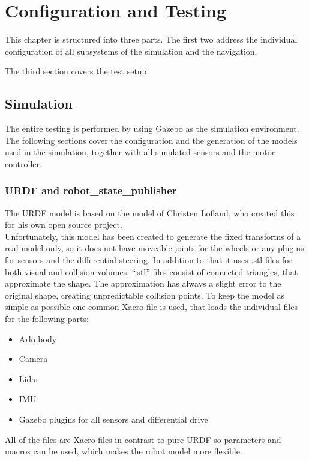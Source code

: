 \chapter{Configuration and Testing}
\label{configurationandtesting}

This chapter is structured into three parts. The first two address the individual configuration of all subsystems of the simulation and the navigation.

The third section covers the test setup.

\section{Simulation}
The entire testing is performed by using Gazebo as the simulation environment. The following sections cover the configuration and the generation of the models used in the simulation, together with all simulated sensors and the motor controller.

\subsection{URDF and robot\_state\_publisher}

The URDF model is based on the model of Christen Lofland, who created this for his own open source project\cite{chrisl8}.\\

Unfortunately, this model has been created to generate the fixed transforms of a real model only, so it does not have moveable joints for the wheels or any plugins for sensors and the differential steering. In addition to that it uses .stl files for both visual and collision volumes. ``.stl'' files consist of connected triangles, that approximate the shape. The approximation has always a slight error to the original shape, creating unpredictable collision points.
To keep the model as simple as possible one common Xacro file is used, that loads the individual files for the following parts:
\begin{itemize}
	\item Arlo body
	\item Camera
	\item Lidar
	\item IMU
	\item Gazebo plugins for all sensors and differential drive
\end{itemize}

All of the files are Xacro files in contrast to pure URDF so parameters and macros can be used, which makes the robot model more flexible.\\

